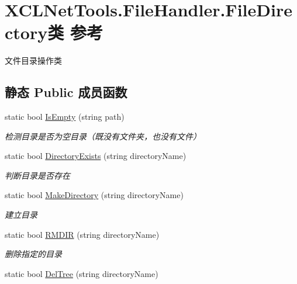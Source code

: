 \hypertarget{class_x_c_l_net_tools_1_1_file_handler_1_1_file_directory}{}\section{X\+C\+L\+Net\+Tools.\+File\+Handler.\+File\+Directory类 参考}
\label{class_x_c_l_net_tools_1_1_file_handler_1_1_file_directory}


文件目录操作类  


\subsection*{静态 Public 成员函数}
\begin{DoxyCompactItemize}
\item 
static bool \hyperlink{class_x_c_l_net_tools_1_1_file_handler_1_1_file_directory_ac644b5cfdbc06559b2691ca6751506df}{Is\+Empty} (string path)
\begin{DoxyCompactList}\small\item\em 检测目录是否为空目录（既没有文件夹，也没有文件） \end{DoxyCompactList}\item 
static bool \hyperlink{class_x_c_l_net_tools_1_1_file_handler_1_1_file_directory_a1bc5d74fb797d8f8271caf1601f428fe}{Directory\+Exists} (string directory\+Name)
\begin{DoxyCompactList}\small\item\em 判断目录是否存在 \end{DoxyCompactList}\item 
static bool \hyperlink{class_x_c_l_net_tools_1_1_file_handler_1_1_file_directory_a8f3ce048a9225a0b699d7bbc510bd9e3}{Make\+Directory} (string directory\+Name)
\begin{DoxyCompactList}\small\item\em 建立目录 \end{DoxyCompactList}\item 
static bool \hyperlink{class_x_c_l_net_tools_1_1_file_handler_1_1_file_directory_aea79f469e66f1668c6bb4eff61bf9279}{R\+M\+D\+IR} (string directory\+Name)
\begin{DoxyCompactList}\small\item\em 删除指定的目录 \end{DoxyCompactList}\item 
static bool \hyperlink{class_x_c_l_net_tools_1_1_file_handler_1_1_file_directory_a1810da560c803121e71fa92fd4f9d180}{Del\+Tree} (string directory\+Name)

\end{DoxyCompactItemize}
